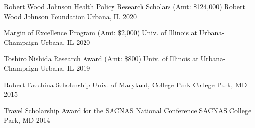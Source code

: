




\begin{cvhonors}

  \cvhonor
    {Robert Wood Johnson Health Policy Research Scholars (Amt: \$124,000)} %
    {Robert Wood Johnson Foundation} %
    {Urbana, IL} %
    {2020} %

  \cvhonor
    {Margin of Excellence Program (Amt: \$2,000)} %
    {Univ. of Illinois at Urbana-Champaign} %
    {Urbana, IL} %
    {2020} %

  \cvhonor
    {Toshiro Nishida Research Award (Amt: \$800) } %
    {Univ. of Illinois at Urbana-Champaign} %
    {Urbana, IL} %
    {2019} %
    
  \cvhonor
    {Robert Facchina Scholarship } %
    {Univ. of Maryland, College Park} %
    {College Park, MD} %
    {2015} %
    
  \cvhonor
    {Travel Scholarship Award for the SACNAS National Conference } %
    {SACNAS} %
    {College Park, MD} %
    {2014} %


\end{cvhonors}

